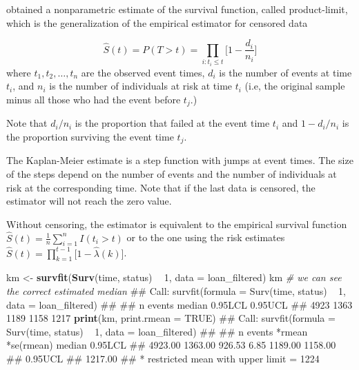 \documentclass[]{book}
\makeatletter
\newenvironment{Shaded}{\begin{snugshade}}{\end{snugshade}}
\newcommand{\KeywordTok}[1]{\textcolor[rgb]{0.13,0.29,0.53}{\textbf{#1}}}
\newcommand{\DataTypeTok}[1]{\textcolor[rgb]{0.13,0.29,0.53}{#1}}
\newcommand{\DecValTok}[1]{\textcolor[rgb]{0.00,0.00,0.81}{#1}}
\newcommand{\StringTok}[1]{\textcolor[rgb]{0.31,0.60,0.02}{#1}}
\newcommand{\CommentTok}[1]{\textcolor[rgb]{0.56,0.35,0.01}{\textit{#1}}}
\newcommand{\OtherTok}[1]{\textcolor[rgb]{0.56,0.35,0.01}{#1}}
\newcommand{\OperatorTok}[1]{\textcolor[rgb]{0.81,0.36,0.00}{\textbf{#1}}}
\newcommand{\NormalTok}[1]{#1}
\newenvironment{kframe}{%
\medskip{}
\setlength{\fboxsep}{.8em}
 \def\at@end@of@kframe{}%
 \ifinner\ifhmode%
  \def\at@end@of@kframe{\end{minipage}}%
  \begin{minipage}{\columnwidth}%
 \fi\fi%
 \def\FrameCommand##1{\hskip\@totalleftmargin \hskip-\fboxsep
 \colorbox{shadecolor}{##1}\hskip-\fboxsep
     \hskip-\linewidth \hskip-\@totalleftmargin \hskip\columnwidth}%
 \MakeFramed {\advance\hsize-\width
   \@totalleftmargin\z@ \linewidth\hsize
   \@setminipage}}%
 {\par\unskip\endMakeFramed%
 \at@end@of@kframe}
\renewenvironment{Shaded}{\begin{kframe}}{\end{kframe}}
\theoremstyle{definition}
\theoremstyle{definition}
\theoremstyle{definition}
\theoremstyle{remark}
\makeatother
\begin{document}
\citet{KM58} obtained a nonparametric estimate of the survival function,
called product-limit, which is the generalization of the empirical
estimator for censored data

\[
\hat S(t) = P(T \gt t) = \prod_{i:t_i \le t} \bigg[1-\frac{d_i}{n_i} \bigg]
\] where \(t_1, t_2, \ldots,t_n\) are the observed event times, \(d_i\)
is the number of events at time \(t_i\), and \(n_i\) is the number of
individuals at risk at time \(t_i\) (i.e, the original sample minus all
those who had the event before \(t_j\).)

Note that \(d_i/n_i\) is the proportion that failed at the event time
\(t_i\) and \(1 - d_i/n_i\) is the proportion surviving the event time
\(t_j\).

The Kaplan-Meier estimate is a step function with jumps at event times.
The size of the steps depend on the number of events and the number of
individuals at risk at the corresponding time. Note that if the last
data is censored, the estimator will not reach the zero value.

Without censoring, the estimator is equivalent to the empirical survival
function \(\hat S(t) = \frac{1}{n} \sum_{i=1}^{n} I(t_i \gt t)\) or to
the one using the risk estimates
\(\hat S(t) = \prod_{k = 1}^{t-1} \bigg [ 1- \hat \lambda(k)\bigg]\).

\begin{Shaded}
\begin{Highlighting}[]
\NormalTok{km <-}\StringTok{ }\KeywordTok{survfit}\NormalTok{(}\KeywordTok{Surv}\NormalTok{(time, status) }\OperatorTok{~}\StringTok{ }\DecValTok{1}\NormalTok{, }\DataTypeTok{data =}\NormalTok{ loan_filtered)}
\NormalTok{km  }\CommentTok{# we can see the correct estimated median}
\NormalTok{## Call: survfit(formula = Surv(time, status) ~ 1, data = loan_filtered)}
\NormalTok{## }
\NormalTok{##       n  events  median 0.95LCL 0.95UCL }
\NormalTok{##    4923    1363    1189    1158    1217}
\KeywordTok{print}\NormalTok{(km, }\DataTypeTok{print.rmean =} \OtherTok{TRUE}\NormalTok{)}
\NormalTok{## Call: survfit(formula = Surv(time, status) ~ 1, data = loan_filtered)}
\NormalTok{## }
\NormalTok{##          n     events     *rmean *se(rmean)     median    0.95LCL }
\NormalTok{##    4923.00    1363.00     926.53       6.85    1189.00    1158.00 }
\NormalTok{##    0.95UCL }
\NormalTok{##    1217.00 }
\NormalTok{##     * restricted mean with upper limit =  1224}
\end{Highlighting}
\end{Shaded}
\end{document}

